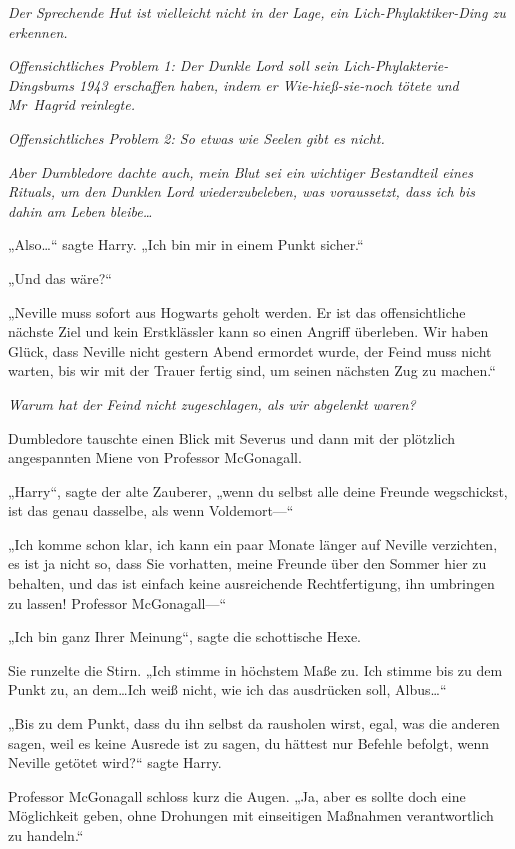 {\emph{Der Sprechende Hut ist vielleicht nicht in der Lage, ein Lich-Phylaktiker-Ding zu erkennen.}

\emph{Offensichtliches Problem 1: Der Dunkle Lord soll sein Lich-Phylakterie-Dingsbums 1943 erschaffen haben, indem er Wie-hieß-sie-noch tötete und Mr~Hagrid reinlegte.}

\emph{Offensichtliches Problem 2: So etwas wie Seelen gibt es nicht.}

\emph{Aber Dumbledore dachte auch, mein Blut sei ein wichtiger Bestandteil eines Rituals, um den Dunklen Lord wiederzubeleben, was voraussetzt, dass ich bis dahin am Leben bleibe…}

„Also…“ sagte Harry. „Ich bin mir in einem Punkt sicher.“

„Und das wäre?“

„Neville muss sofort aus Hogwarts geholt werden. Er ist das offensichtliche nächste Ziel und kein Erstklässler kann so einen Angriff überleben. Wir haben Glück, dass Neville nicht gestern Abend ermordet wurde, der Feind muss nicht warten, bis wir mit der Trauer fertig sind, um seinen nächsten Zug zu machen.“

\emph{Warum hat der Feind nicht zugeschlagen, als wir abgelenkt waren?}

Dumbledore tauschte einen Blick mit Severus und dann mit der plötzlich angespannten Miene von Professor McGonagall.

„Harry“, sagte der alte Zauberer, „wenn du selbst alle deine Freunde wegschickst, ist das genau dasselbe, als wenn Voldemort—“

„Ich komme schon klar, ich kann ein paar Monate länger auf Neville verzichten, es ist ja nicht so, dass Sie vorhatten, meine Freunde über den Sommer hier zu behalten, und das ist einfach keine ausreichende Rechtfertigung, ihn umbringen zu lassen! Professor McGonagall—“

„Ich bin ganz Ihrer Meinung“, sagte die schottische Hexe.

Sie runzelte die Stirn. „Ich stimme in höchstem Maße zu. Ich stimme bis zu dem Punkt zu, an dem…Ich weiß nicht, wie ich das ausdrücken soll, Albus…“

„Bis zu dem Punkt, dass du ihn selbst da rausholen wirst, egal, was die anderen sagen, weil es keine Ausrede ist zu sagen, du hättest nur Befehle befolgt, wenn Neville getötet wird?“ sagte Harry.

Professor McGonagall schloss kurz die Augen. „Ja, aber es sollte doch eine Möglichkeit geben, ohne Drohungen mit einseitigen Maßnahmen verantwortlich zu handeln.“

}
